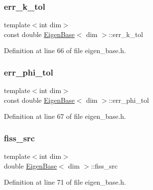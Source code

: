 \subsubsection{\texorpdfstring{err\+\_\+k\+\_\+tol}{err\_k\_tol}}
{\footnotesize\ttfamily template$<$int dim$>$ \\
const double \hyperlink{class_eigen_base}{Eigen\+Base}$<$ dim $>$\+::err\+\_\+k\+\_\+tol\hspace{0.3cm}{\ttfamily [protected]}}



Definition at line 66 of file eigen\+\_\+base.\+h.

\mbox{\label{class_eigen_base_acc8e2b79484a329d746a55ba656feead}} 
\subsubsection{\texorpdfstring{err\+\_\+phi\+\_\+tol}{err\_phi\_tol}}
{\footnotesize\ttfamily template$<$int dim$>$ \\
const double \hyperlink{class_eigen_base}{Eigen\+Base}$<$ dim $>$\+::err\+\_\+phi\+\_\+tol\hspace{0.3cm}{\ttfamily [protected]}}



Definition at line 67 of file eigen\+\_\+base.\+h.

\mbox{\label{class_eigen_base_a6fa0753510038439c30de5c1832e4ebc}} 
\subsubsection{\texorpdfstring{fiss\+\_\+src}{fiss\_src}}
{\footnotesize\ttfamily template$<$int dim$>$ \\
double \hyperlink{class_eigen_base}{Eigen\+Base}$<$ dim $>$\+::fiss\+\_\+src\hspace{0.3cm}{\ttfamily [protected]}}



Definition at line 71 of file eigen\+\_\+base.\+h.

\mbox{\label{class_eigen_base_aa324e40bd20edd51659416da3220d295}} 
